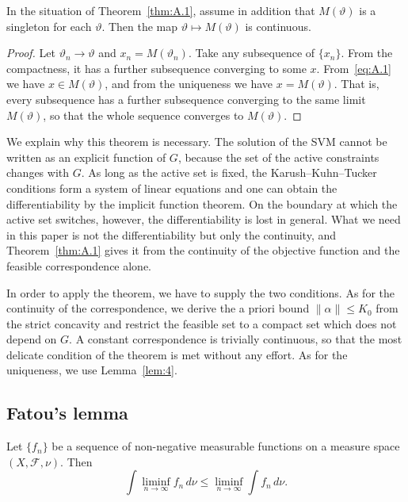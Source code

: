 \begin{corollary}
\label{cor:A.1}
In the situation of Theorem~\ref{thm:A.1}, assume in addition that $M(\vartheta)$
is a singleton for each $\vartheta$. Then the map $\vartheta\mapsto M(\vartheta)$
is continuous.
\end{corollary}

\begin{proof}
Let $\vartheta_n\to\vartheta$ and $x_n=M(\vartheta_n)$. Take any subsequence of
$\{x_n\}$. From the compactness, it has a further subsequence converging to some
$x$. From~\eqref{eq:A.1} we have $x\in M(\vartheta)$, and from the uniqueness we
have $x=M(\vartheta)$. That is, every subsequence has a further subsequence
converging to the same limit $M(\vartheta)$, so that the whole sequence converges
to $M(\vartheta)$.
\end{proof}

We explain why this theorem is necessary. The solution of the SVM cannot be
written as an explicit function of $G$, because the set of the active constraints
changes with $G$. As long as the active set is fixed, the Karush--Kuhn--Tucker
conditions form a system of linear equations and one can obtain the
differentiability by the implicit function theorem. On the boundary at which the
active set switches, however, the differentiability is lost in general. What we
need in this paper is not the differentiability but only the continuity, and
Theorem~\ref{thm:A.1} gives it from the continuity of the objective function and
the feasible correspondence alone.

In order to apply the theorem, we have to supply the two conditions. As for the
continuity of the correspondence, we derive the a priori bound $\|\alpha\|\le K_0$
from the strict concavity and restrict the feasible set to a compact set which
does not depend on $G$. A constant correspondence is trivially continuous, so that
the most delicate condition of the theorem is met without any effort. As for the
uniqueness, we use Lemma~\ref{lem:4}.

\subsection{Fatou's lemma}
\label{app:A.2}

\begin{theorem}
\label{thm:A.2}
Let $\{f_n\}$ be a sequence of non-negative measurable functions on a measure
space $(X,\mathcal{F},\nu)$. Then
\begin{equation}
\int\liminf_{n\to\infty}f_n\,d\nu
\le\liminf_{n\to\infty}\int f_n\,d\nu.
\label{eq:A.2}
\end{equation}
\end{theorem}

